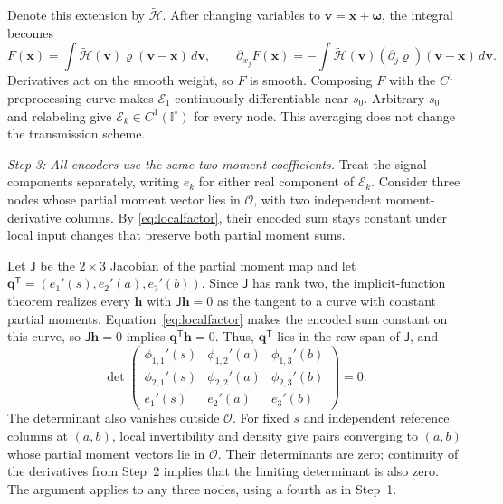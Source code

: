 \documentclass[journal,12pt,onecolumn,draftclsnofoot]{IEEEtran}
\newcommand{\T}{\mathsf T}\newcommand{\suc}{\succeq}
\begin{document}
Denote this extension by $\widetilde{\mathscr H}$. After changing
variables to $\boldsymbol v=\boldsymbol x+\boldsymbol\omega$, the integral becomes
$$
F(\boldsymbol x)=\int\widetilde{\mathscr H}(\boldsymbol v)
\varrho(\boldsymbol v-\boldsymbol x)\,d\boldsymbol v,
\qquad
\partial_{x_j}F(\boldsymbol x)=-\int
\widetilde{\mathscr H}(\boldsymbol v)
(\partial_j\varrho)(\boldsymbol v-\boldsymbol x)\,d\boldsymbol v.
$$
Derivatives act on the smooth weight, so $F$ is smooth.
Composing $F$ with the $C^1$ preprocessing curve makes
$\mathscr E_1$ continuously differentiable near $s_0$.
Arbitrary $s_0$ and relabeling give $\mathscr E_k\in C^1(\mathbb I^\circ)$
for every node. This averaging does not change the transmission scheme.





\emph{Step 3: All encoders use the same two moment coefficients.} Treat the signal components separately, writing $e_k$ for either real
component of $\mathscr E_k$. Consider three nodes whose partial moment
vector lies in $\mathcal O$, with two independent moment-derivative columns.
By \eqref{eq:localfactor}, their encoded sum stays constant under local
input changes that preserve both partial moment sums.


Let $\mathsf J$ be the $2\times3$ Jacobian of the partial moment
map and let $\boldsymbol q^\T=(e_1'(s),e_2'(a),e_3'(b))$.
Since $\mathsf J$ has rank two, the implicit-function theorem
realizes every $\boldsymbol h$ with $\mathsf J\boldsymbol h=0$
as the tangent to a curve with constant partial moments.
Equation~\eqref{eq:localfactor} makes the encoded sum constant
on this curve, so $\mathsf J\boldsymbol h=0$ implies
$\boldsymbol q^\T\boldsymbol h=0$.
Thus, $\boldsymbol q^\T$ lies in the row span of $\mathsf J$,
and
$$
 \det\begin{pmatrix}
 \phi_{1,1}'(s)&\phi_{1,2}'(a)&\phi_{1,3}'(b)\\
 \phi_{2,1}'(s)&\phi_{2,2}'(a)&\phi_{2,3}'(b)\\
 e_1'(s)&e_2'(a)&e_3'(b)
 \end{pmatrix}=0.
$$
The determinant also vanishes outside $\mathcal O$.
For fixed $s$ and independent reference columns at $(a,b)$,
local invertibility and density give pairs converging to $(a,b)$
whose partial moment vectors lie in $\mathcal O$.
Their determinants are zero; continuity of the derivatives from
Step~2 implies that the limiting determinant is also zero. The argument applies to any three
nodes, using a fourth as in Step~1.
\end{document}
